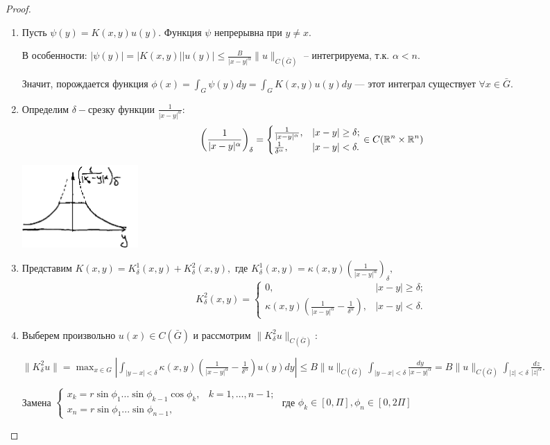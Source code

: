 \begin{proof} $\ $
\begin{enumerate}
\item{
Пусть $\psi(y) = K(x,y)u(y).$ Функция $\psi$ непрерывна при $y \ne x.$

В особенности: $|\psi(y)| = |K(x,y)||u(y)| \le \frac{B}{|x-y|^\alpha} \|u\|_{C(\bar G)}$ -- интегрируема, т.к. $\alpha < n.$

Значит, порождается функция $\phi(x) = \int_G\psi(y)dy = \int_G K(x,y)u(y)dy$ --- этот интеграл существует $\forall x \in \bar G.$
}

\item{Определим $\delta-$срезку функции $\frac{1}{|x-y|^\alpha}:$ $$\left(\frac{1}{|x-y|^\alpha}\right)_\delta = \begin{cases}
   \frac{1}{|x-y|^\alpha}, &|x-y|\ge \delta;\\
   \frac{1}{\delta^\alpha}, & |x-y|<\delta.
 \end{cases} \in C (\mathbb{R}^n \times \mathbb{R}^n)$$
}
\begin{center}
\includegraphics[width=0.2\textwidth]{24_1_new}
\end{center}

\item{Представим $K(x,y) = K^1_\delta (x,y) + K^2_\delta(x,y),$ где $K^1_\delta (x,y) = \kappa(x,y)(\frac{1}{|x-y|^\alpha})_\delta,$ $$K^2_\delta(x,y) = \begin{cases}
   0, &|x-y|\ge \delta;\\
   \kappa(x,y)(\frac{1}{|x-y|^\alpha}-\frac{1}{\delta^\alpha}), & |x-y|<\delta.
 \end{cases}$$
}

\item{ Выберем произвольно $u(x) \in C(\bar G)$ и рассмотрим $\|K^2_\delta u\|_{C(\bar G)}$: 

$\|K^2_\delta u\| = \max_{x \in G} |\int_{|y-x|<\delta}\kappa(x,y)(\frac{1}{|x-y|^\alpha}-\frac{1}{\delta^\alpha})u(y)dy| \le B\|u\|_{C(\bar G)}\int_{|y-x|<\delta}\frac{dy}{|x-y|^\alpha} = B \|u\|_{C(\bar G)}\int_{|z|<\delta}\frac{dz}{|z|^\alpha}.
$

Замена $\begin{cases}
   x_k = r\sin\phi_1...\sin\phi_{k-1}\cos\phi_k, &k = 1, \dots, n-1;\\
   x_n = r\sin\phi_1...\sin\phi_{n-1},
 \end{cases}$ где $\phi_k \in [0, \Pi], \phi_n \in [0, 2\Pi]$
 
}
\end{enumerate}
\end{proof}

